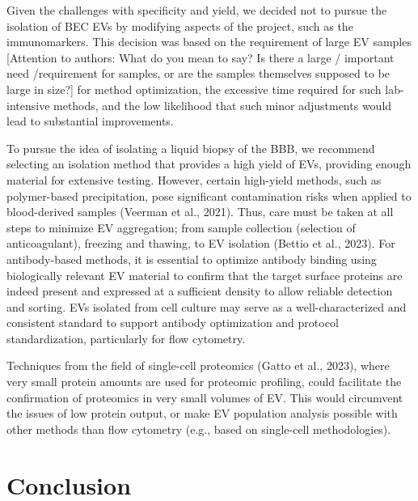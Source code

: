 \documentclass[authordate, empirical]{jote-new-article}
\begin{document}
	Given the challenges with specificity and yield, we decided not to pursue the isolation of BEC EVs by modifying aspects of the project, such as the immunomarkers. This decision was based on the requirement of large EV samples [Attention to authors: What do you mean to say? Is there a large / important need /requirement for samples, or are the samples themselves supposed to be large in size?] for method optimization, the excessive time required for such lab-intensive methods, and the low likelihood that such minor adjustments would lead to substantial improvements.



	To pursue the idea of isolating a liquid biopsy of the BBB, we recommend selecting an isolation method that provides a high yield of EVs, providing enough material for extensive testing. However, certain high-yield methods, such as polymer-based precipitation, pose significant contamination risks when applied to blood-derived samples (Veerman et al., 2021). Thus, care must be taken at all steps to minimize EV aggregation; from sample collection (selection of anticoagulant), freezing and thawing, to EV isolation (Bettio et al., 2023). For antibody-based methods, it is essential to optimize antibody binding using biologically relevant EV material to confirm that the target surface proteins are indeed present and expressed at a sufficient density to allow reliable detection and sorting. EVs isolated from cell culture may serve as a well-characterized and consistent standard to support antibody optimization and protocol standardization, particularly for flow cytometry.



	Techniques from the field of single-cell proteomics (Gatto et al., 2023), where very small protein amounts are used for proteomic profiling, could facilitate the confirmation of proteomics in very small volumes of EV. This would circumvent the issues of low protein output, or make EV population analysis possible with other methods than flow cytometry (e.g., based on single-cell methodologies).











	\section{Conclusion }
\end{document}
